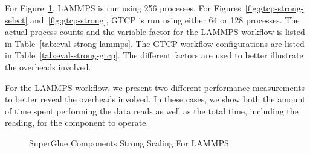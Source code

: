 \documentclass[conference]{IEEEtran}
\begin{document}
For Figure~\ref{fig:lammps-strong}, LAMMPS is run using 256 processes.  For
Figures~\ref{fig:gtcp-strong-select} and~\ref{fig:gtcp-strong}, GTCP is run
using either 64 or 128 processes. The actual process counts and the variable
factor for the LAMMPS workflow is listed in Table~\ref{tab:eval-strong-lammps}.
The GTCP workflow configurations are listed in
Table~\ref{tab:eval-strong-gtcp}.  The different factors are used to better
illustrate the overheads involved.

For the LAMMPS workflow, we present two different performance measurements to
better reveal the overheads involved. In these cases, we show both the amount
of time spent performing the data reads as well as the total time, including
the reading, for the component to operate.

\begin{figure}[t!]
\center
{}
\caption{SuperGlue Components Strong Scaling For LAMMPS}
\label{fig:lammps-strong}
\end{figure}
\end{document}
